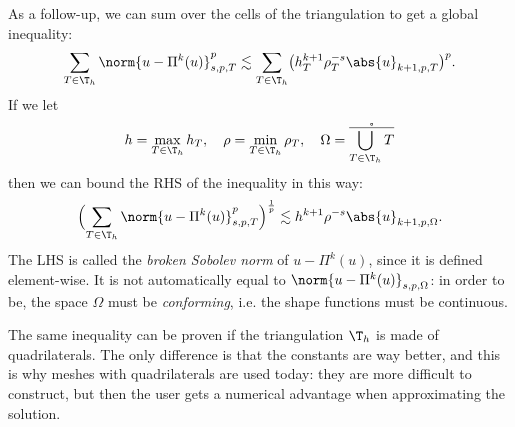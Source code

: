 As a follow-up, we can sum over the cells of the triangulation to get a global inequality:
\[
\sum_{T \in \T_h} \norm{u- \Pi^k(u)}_{s,p,T}^p \lesssim
\sum_{T \in \T_h} \bigl( h_T^{k+1} \rho_T^{-s} \abs{u}_{k+1,p,T} \bigr)^p.
\]
If we let
\[
h = \max_{T \in \T_h} h_T, \quad \rho = \min_{T \in \T_h} \rho_T, \quad \Omega = \mathring{\overline{\bigcup_{T \in \T_h} T}}
\]
then we can bound the RHS of the inequality in this way:
\[
\Bigl( \sum_{T \in \T_h} \norm{u- \Pi^k(u)}_{s,p,T}^p \Bigr)^\frac{1}{p} \lesssim
h^{k+1} \rho^{-s} \abs{u}_{k+1,p,\Omega}.
\]
The LHS is called the \emph{broken Sobolev norm} of $u-\Pi^k(u)$, since it is defined element-wise. It is not automatically equal to $\norm{u- \Pi^k(u)}_{s,p,\Omega}$: in order to be, the space $\Omega$ must be \emph{conforming}, i.e. the shape functions must be continuous.

\begin{remark}
The same inequality can be proven if the triangulation $\T_h$ is made of quadrilaterals. The only difference is that the constants are way better, and this is why meshes with quadrilaterals are used today: they are more difficult to construct, but then the user gets a numerical advantage when approximating the solution.
\end{remark}

